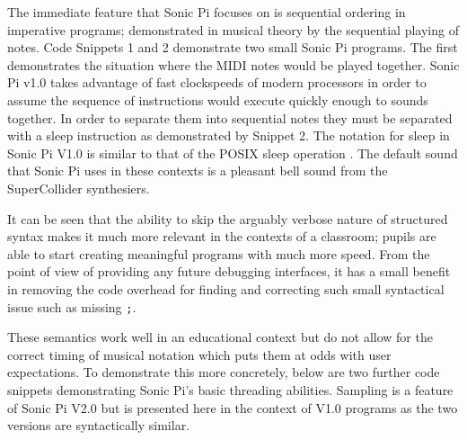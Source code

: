 \documentclass[11pt, abstracton, twoside, titlepage=true]{scrartcl}
\begin{document}
The immediate feature that Sonic Pi focuses on is sequential ordering in 
imperative programs; demonstrated in musical theory by the sequential playing 
of notes. Code Snippets 1 and 2 demonstrate two small Sonic Pi programs. The 
first demonstrates the situation where the MIDI notes would be played together. 
Sonic Pi v1.0 takes advantage of fast clockspeeds of modern processors in order 
to assume the sequence of instructions would execute quickly enough 
to sounds together. In order to separate them into sequential notes they must 
be separated with a sleep instruction as demonstrated by Snippet 2. The notation 
for sleep in Sonic Pi V1.0 is similar to that of the POSIX sleep operation 
\cite{IG13}. The default sound that Sonic Pi uses in these contexts is a 
pleasant bell sound from the SuperCollider synthesiers.

It can be seen that the ability to skip the arguably verbose nature of 
structured syntax makes it much more relevant in the contexts of a classroom; 
pupils are able to start creating meaningful programs with much more speed. From 
the point of view of providing any future debugging interfaces, it has a small 
benefit in removing the code overhead for finding and correcting such small 
syntactical issue such as missing \texttt{;}. 

These semantics work well in an educational context but do not allow for the 
correct timing of musical notation which puts them at odds with user 
expectations. To demonstrate this more concretely, below are two further code 
snippets demonstrating Sonic Pi's basic threading abilities. Sampling is a 
feature of Sonic Pi V2.0 but is presented here in the context of V1.0 
programs as the two versions are syntactically similar.
\end{document}
